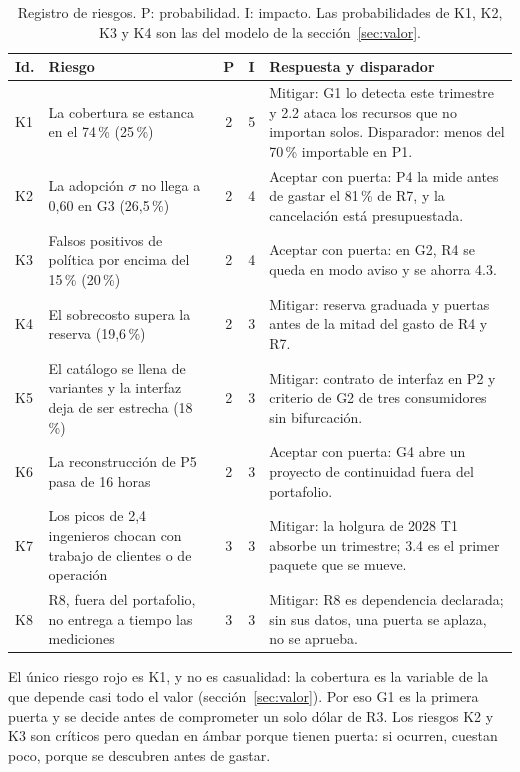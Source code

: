 \documentclass[11pt,letterpaper]{article}
\newcommand{\pct}{\,\%}
\begin{document}
\begin{table}[H]
\centering
\footnotesize
\setlength{\tabcolsep}{3pt}
\caption{Registro de riesgos. P: probabilidad. I: impacto. Las probabilidades
de K1, K2, K3 y K4 son las del modelo de la sección~\ref{sec:valor}.}
\label{tab:riesgos}
\begin{tabularx}{\textwidth}{@{}l>{\raggedright\arraybackslash}p{4.6cm}cc>{\raggedright\arraybackslash}X@{}}
\toprule
\textbf{Id.} & \textbf{Riesgo} & \textbf{P} & \textbf{I} &
  \textbf{Respuesta y disparador} \\
\midrule
K1 & La cobertura se estanca en el 74\pct{} (25\pct) & 2 & 5 & Mitigar: G1 lo
  detecta este trimestre y 2.2 ataca los recursos que no importan solos.
  Disparador: menos del 70\pct{} importable en P1. \\
K2 & La adopción $\sigma$ no llega a 0,60 en G3 (26,5\pct) & 2 & 4 & Aceptar
  con puerta: P4 la mide antes de gastar el 81\pct{} de R7, y la cancelación
  está presupuestada. \\
K3 & Falsos positivos de política por encima del 15\pct{} (20\pct) & 2 & 4 &
  Aceptar con puerta: en G2, R4 se queda en modo aviso y se ahorra 4.3. \\
K4 & El sobrecosto supera la reserva (19,6\pct) & 2 & 3 & Mitigar: reserva
  graduada y puertas antes de la mitad del gasto de R4 y R7. \\
K5 & El catálogo se llena de variantes y la interfaz deja de ser estrecha
  (18\pct) & 2 & 3 & Mitigar: contrato de interfaz en P2 y criterio de G2 de
  tres consumidores sin bifurcación. \\
K6 & La reconstrucción de P5 pasa de 16 horas & 2 & 3 & Aceptar con puerta:
  G4 abre un proyecto de continuidad fuera del portafolio. \\
K7 & Los picos de 2,4 ingenieros chocan con trabajo de clientes o de
  operación & 3 & 3 & Mitigar: la holgura de 2028 T1 absorbe un trimestre; 3.4
  es el primer paquete que se mueve. \\
K8 & R8, fuera del portafolio, no entrega a tiempo las mediciones & 3 & 3 &
  Mitigar: R8 es dependencia declarada; sin sus datos, una puerta se aplaza,
  no se aprueba. \\
\bottomrule
\end{tabularx}
\end{table}

El único riesgo rojo es K1, y no es casualidad: la cobertura es la variable de
la que depende casi todo el valor (sección~\ref{sec:valor}). Por eso G1 es la
primera puerta y se decide antes de comprometer un solo dólar de R3. Los riesgos
K2 y K3 son críticos pero quedan en ámbar porque tienen puerta: si ocurren,
cuestan poco, porque se descubren antes de gastar.
\end{document}
